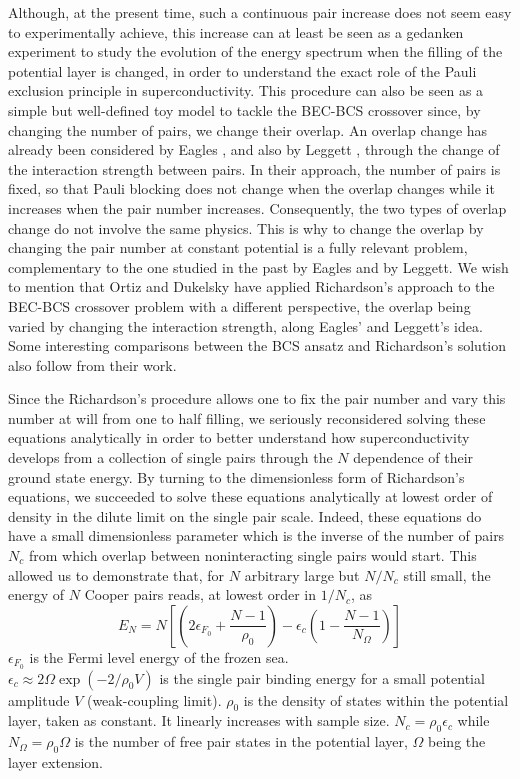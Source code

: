 \documentclass[epj]{svjour}
\begin{document}
Although, at the present time, such a continuous pair increase
does not seem easy to experimentally achieve, this increase can at least be seen as a 
gedanken experiment to study the evolution of the energy spectrum when
the filling of the potential layer is changed, in order to understand the exact role of the Pauli
exclusion principle in superconductivity. 
This procedure can also be
seen as a simple but well-defined toy model to tackle the BEC-BCS crossover
since, by changing the number of pairs, we change their overlap. 
An overlap change has already been considered by Eagles \cite{Eagle}, 
and also by Leggett \cite{LeggettCrossover}, through the change of the interaction strength between pairs. In their approach, the number of pairs is fixed, so that Pauli blocking does not change when the overlap changes while it increases when the pair number increases. Consequently, the two types of overlap change do not involve the same physics. This is why to change the overlap by changing the pair number at constant potential is a fully relevant problem, complementary to the one studied in the past by Eagles and by Leggett. We wish to mention that Ortiz and Dukelsky have applied Richardson's approach to the BEC-BCS crossover problem with a different perspective, the overlap being varied by changing the interaction strength\cite{crossoverRich}, along Eagles' and  Leggett's idea.  Some interesting comparisons between the BCS ansatz and Richardson's solution also follow from their work.  


Since the Richardson's procedure allows one to fix the pair number and vary 
this number at will from one to half filling, we seriously reconsidered 
solving these equations analytically in order to better understand how superconductivity develops from a collection of single pairs through the $N$ dependence of their ground state energy. By turning to the dimensionless form of Richardson's equations, we succeeded to solve these equations analytically at lowest order of density in the dilute limit on the single pair scale\cite{paper1}. 
Indeed, these equations do have a small dimensionless parameter which is the inverse of the number of pairs $N_{c}$ from which overlap between noninteracting single pairs would start. 
This allowed us to demonstrate that, for $N$ arbitrary large but $N/N_{c}$ still small, 
the energy of $N$ Cooper pairs reads, at lowest order in $1/ N_{c}$, as
\begin{equation}
E_{N}= N\left[ \left( 2\epsilon _{F_{0}}+\frac{N-1}{\rho _{0}}%
\right)-\epsilon _{c}\left( 1-\frac{N-1}{N_{\Omega }}\right) \right]
\label{eq:eN}
\end{equation}%
$\epsilon _{F_{0}}$ is the Fermi level energy of the frozen sea.  \\$\epsilon _{c}\approx
2\Omega \exp \left( -2/\rho _{0}V\right) $ is the single pair binding
energy for a small potential amplitude $V$ (weak-coupling limit). $\rho
_{0} $ is the density of states within the potential
layer, taken as constant. It linearly increases with sample size. $N_{c }=\rho _{0}\epsilon _{c} $ while $N_{\Omega }=\rho _{0}\Omega $ is the number of free pair states in the potential
layer, $\Omega $ being the layer extension.
\end{document}
